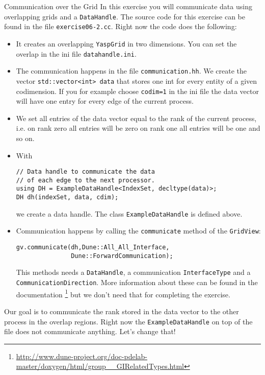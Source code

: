 \documentclass[12pt,a4paper]{article}
\begin{document}
\begin{Exercise}{Communication over the Grid}
  In this exercise you will communicate data using overlapping grids
  and a \lstinline{DataHandle}. The source code for this exercise can
  be found in the file \lstinline{exercise06-2.cc}. Right now the code
  does the following:
  \begin{itemize}
  \item It creates an overlapping \lstinline{YaspGrid} in two
    dimensions. You can set the overlap in the ini file
    \lstinline{datahandle.ini}.
  \item The communication happens in the file
    \lstinline{communication.hh}.  We create the vector
    \lstinline{std::vector<int> data} that stores one int for every
    entity of a given codimension. If you for example choose
    \lstinline{codim=1} in the ini file the data vector will have one
    entry for every edge of the current process.
  \item We set all entries of the data vector equal to the rank of the
    current process, i.e. on rank zero all entries will be zero on
    rank one all entries will be one and so on.
  \item With
    \begin{lstlisting}
// Data handle to communicate the data
// of each edge to the next processor.
using DH = ExampleDataHandle<IndexSet, decltype(data)>;
DH dh(indexSet, data, cdim);
    \end{lstlisting}
    we create a data handle. The class \lstinline{ExampleDataHandle}
    is defined above.
  \item Communication happens by calling the \lstinline{communicate}
    method of the \lstinline{GridView}:
    \begin{lstlisting}
gv.communicate(dh,Dune::All_All_Interface,
               Dune::ForwardCommunication);
    \end{lstlisting}
    This methods needs a \lstinline{DataHandle}, a communication
    \lstinline{InterfaceType} and a
    \lstinline{CommunicationDirection}. More information about these
    can be found in the documentation
    \footnote{\href{http://www.dune-project.org/doc-pdelab-master/doxygen/html/group\_\_GIRelatedTypes.html}{http://www.dune-project.org/doc-pdelab-master/doxygen/html/group\_\_GIRelatedTypes.html}}
    but we don't need that for completing the exercise.
  \end{itemize}
  Our goal is to communicate the rank stored in the data vector to the
  other process in the overlap regions. Right now the
  \lstinline{ExampleDataHandle} on top of the file does not
  communicate anything. Let's change that!


\end{Exercise}
\end{document}
